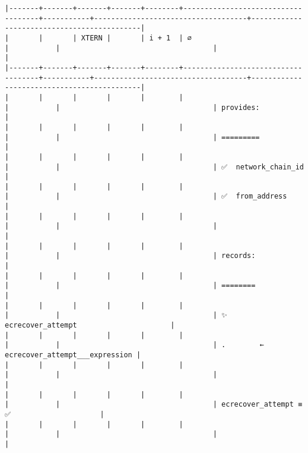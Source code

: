 \documentclass[varwidth=\maxdimen,margin=0.5cm,multi={verbatim}]{standalone}
\begin{document}
\begin{verbatim}
|-------+-------+-------+-------+--------+------------------------------------+-----------+------------------------------------+--------------------------------------------|
|       |       | XTERN |       | i + 1  | ∅                                  |           |                                    |                                            |
|-------+-------+-------+-------+--------+------------------------------------+-----------+------------------------------------+--------------------------------------------|
|       |       |       |       |        |                                    |           |                                    | provides:                                  |
|       |       |       |       |        |                                    |           |                                    | =========                                  |
|       |       |       |       |        |                                    |           |                                    | ✅  network_chain_id                       |
|       |       |       |       |        |                                    |           |                                    | ✅  from_address                           |
|       |       |       |       |        |                                    |           |                                    |                                            |
|       |       |       |       |        |                                    |           |                                    | records:                                   |
|       |       |       |       |        |                                    |           |                                    | ========                                   |
|       |       |       |       |        |                                    |           |                                    | ✨  ecrecover_attempt                      |
|       |       |       |       |        |                                    |           |                                    | .        ←  ecrecover_attempt___expression |
|       |       |       |       |        |                                    |           |                                    |                                            |
|       |       |       |       |        |                                    |           |                                    | ecrecover_attempt ≡ ✅                     |
|       |       |       |       |        |                                    |           |                                    |                                            |

\end{verbatim}
\end{document}
